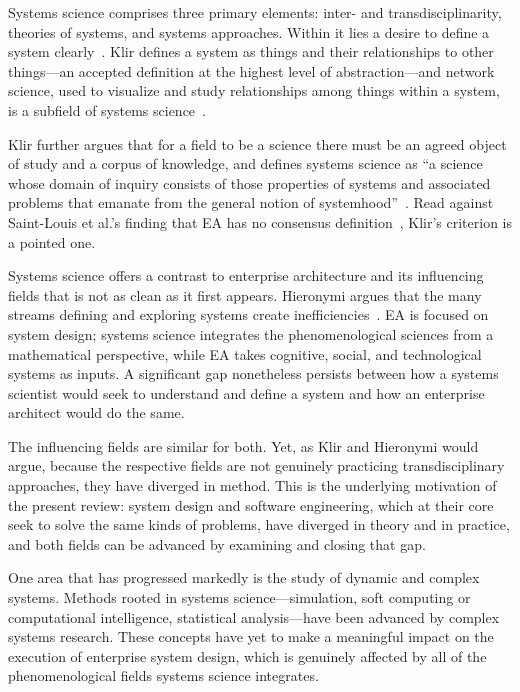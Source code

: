 \documentclass[11pt,a4paper]{article}
\begin{document}
Systems science comprises three primary elements: inter- and
transdisciplinarity, theories of systems, and systems approaches. Within it lies
a desire to define a system clearly~\citep{hieronymi2013}. Klir defines a system
as things and their relationships to other things---an accepted definition at
the highest level of abstraction---and network science, used to visualize and
study relationships among things within a system, is a subfield of systems
science~\citep{klir2001,hieronymi2013}.

Klir further argues that for a field to be a science there must be an agreed
object of study and a corpus of knowledge, and defines systems science as ``a
science whose domain of inquiry consists of those properties of systems and
associated problems that emanate from the general notion of
systemhood''~\citep{klir2001}. Read against Saint-Louis et al.'s finding that EA
has no consensus definition~\citep{saintlouis2017}, Klir's criterion is a
pointed one.

Systems science offers a contrast to enterprise architecture and its influencing
fields that is not as clean as it first appears. Hieronymi argues that the many
streams defining and exploring systems create
inefficiencies~\citep{hieronymi2013}. EA is focused on system design; systems
science integrates the phenomenological sciences from a mathematical
perspective, while EA takes cognitive, social, and technological systems as
inputs. A significant gap nonetheless persists between how a systems scientist
would seek to understand and define a system and how an enterprise architect
would do the same.

The influencing fields are similar for both. Yet, as Klir and Hieronymi would
argue, because the respective fields are not genuinely practicing
transdisciplinary approaches, they have diverged in method. This is the
underlying motivation of the present review: system design and software
engineering, which at their core seek to solve the same kinds of problems, have
diverged in theory and in practice, and both fields can be advanced by
examining and closing that gap.

One area that has progressed markedly is the study of dynamic and complex
systems. Methods rooted in systems science---simulation, soft computing or
computational intelligence, statistical analysis---have been advanced by
complex systems research. These concepts have yet to make a meaningful impact on
the execution of enterprise system design, which is genuinely affected by all of
the phenomenological fields systems science integrates.
\end{document}
